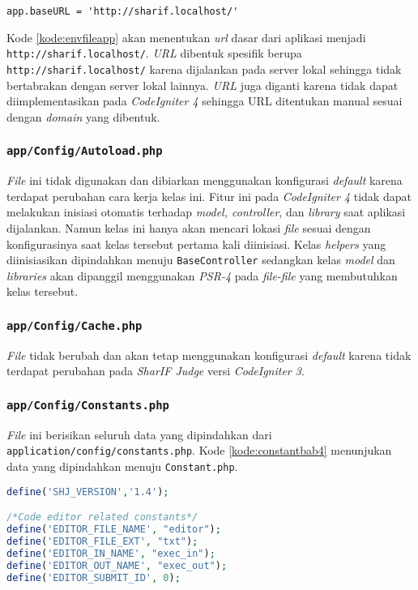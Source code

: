 \begin{lstlisting}[caption= Kode \texttt{application/config/config.php} yang dipindahkan menuju \texttt{.env}, label=kode:envfileapp]
	app.baseURL = 'http://sharif.localhost/'
\end{lstlisting}

Kode \ref{kode:envfileapp} akan menentukan \textit{url} dasar dari aplikasi menjadi \texttt{http://sharif.localhost/}. \textit{URL} dibentuk spesifik berupa \texttt{http://sharif.localhost/} karena dijalankan pada server lokal sehingga tidak bertabrakan dengan server lokal lainnya. \textit{URL} juga diganti karena tidak dapat diimplementasikan pada \textit{CodeIgniter 4} sehingga URL ditentukan manual sesuai dengan \textit{domain} yang dibentuk.

\subsubsection{\texttt{app/Config/Autoload.php}}
\textit{File} ini tidak digunakan dan dibiarkan menggunakan konfigurasi \textit{default} karena terdapat perubahan cara kerja kelas ini. Fitur ini pada \textit{CodeIgniter 4} tidak dapat melakukan inisiasi otomatis terhadap \textit{model, controller}, dan \textit{library} saat aplikasi dijalankan. Namun kelas ini hanya akan mencari lokasi \textit{file} sesuai dengan konfigurasinya saat kelas tersebut pertama kali diinisiasi. Kelas \textit{helpers} yang diinisiasikan dipindahkan menuju \texttt{BaseController} sedangkan kelas \textit{model} dan \textit{libraries} akan dipanggil menggunakan \textit{PSR-4} pada \textit{file-file} yang membutuhkan kelas tersebut.

\subsubsection{\texttt{app/Config/Cache.php}}
\textit{File} tidak berubah dan akan tetap menggunakan konfigurasi \textit{default} karena tidak terdapat perubahan pada \textit{SharIF Judge} versi \textit{CodeIgniter 3}.

\subsubsection{\texttt{app/Config/Constants.php}}
\textit{File} ini berisikan seluruh data yang dipindahkan dari \texttt{application/config/constants.php}. Kode \ref{kode:constantbab4} menunjukan data yang dipindahkan menuju \texttt{Constant.php}.

\begin{lstlisting}[language=PHP, caption=Pemindahan kode pada \textit{Constant}, label=kode:constantbab4]
define('SHJ_VERSION','1.4');

/*Code editor related constants*/
define('EDITOR_FILE_NAME', "editor");
define('EDITOR_FILE_EXT', "txt");
define('EDITOR_IN_NAME', "exec_in");
define('EDITOR_OUT_NAME', "exec_out");
define('EDITOR_SUBMIT_ID', 0);
\end{lstlisting}

